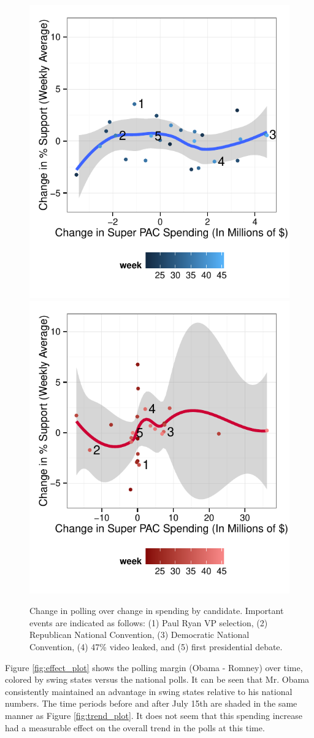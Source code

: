 \documentclass[11pt]{article}\usepackage{graphicx, color}
\newenvironment{knitrout}{}{} %
\begin{document}
\begin{knitrout}
\color{fgcolor}\begin{figure}[H]


{\centering \includegraphics[width=.45\textwidth]{figure/support_spend1} 
\includegraphics[width=.45\textwidth]{figure/support_spend2} 

}

\caption[Change in polling over change in spending by candidate]{Change in polling over change in spending by candidate. Important events are indicated as follows: (1) Paul Ryan VP selection, (2) Republican National Convention, (3) Democratic National Convention, (4) 47\% video leaked, and (5) first presidential debate.\label{fig:support_spend}}
\end{figure}


\end{knitrout}



Figure \ref{fig:effect_plot} shows the polling margin (Obama - Romney) over time, colored by swing states versus the national polls. It can be seen that Mr. Obama consistently maintained an advantage in swing states relative to his national numbers. The time periods before and after July 15th are shaded in the same manner as Figure \ref{fig:trend_plot}. It does not seem that this spending increase had a measurable effect on the overall trend in the polls at this time.
\end{document}
